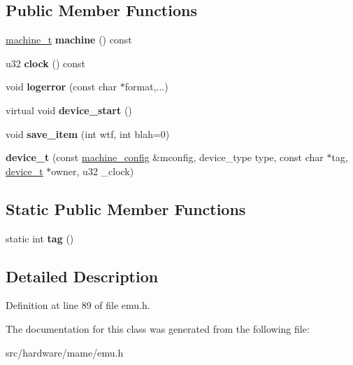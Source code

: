 \subsection*{Public Member Functions}
\begin{DoxyCompactItemize}
\item 
\hypertarget{classdevice__t_afe11f3dfed3f5952db60affa12ebece4}{\hyperlink{structdevice__t_1_1machine__t}{machine\-\_\-t} {\bfseries machine} () const }\label{classdevice__t_afe11f3dfed3f5952db60affa12ebece4}

\item 
\hypertarget{classdevice__t_a308991cb836a5d7733deb280d3c91d18}{u32 {\bfseries clock} () const }\label{classdevice__t_a308991cb836a5d7733deb280d3c91d18}

\item 
\hypertarget{classdevice__t_a13fbc9b8b779e8592e871c589ca1a6ad}{void {\bfseries logerror} (const char $\ast$format,...)}\label{classdevice__t_a13fbc9b8b779e8592e871c589ca1a6ad}

\item 
\hypertarget{classdevice__t_a230069bb9d64cc3dc2353e5069be1294}{virtual void {\bfseries device\-\_\-start} ()}\label{classdevice__t_a230069bb9d64cc3dc2353e5069be1294}

\item 
\hypertarget{classdevice__t_a6d4346c89ce538c096e6ae71308336ea}{void {\bfseries save\-\_\-item} (int wtf, int blah=0)}\label{classdevice__t_a6d4346c89ce538c096e6ae71308336ea}

\item 
\hypertarget{classdevice__t_a764a57dca49319a408af8c9f7f86017b}{{\bfseries device\-\_\-t} (const \hyperlink{structmachine__config}{machine\-\_\-config} \&mconfig, device\-\_\-type type, const char $\ast$tag, \hyperlink{classdevice__t}{device\-\_\-t} $\ast$owner, u32 \-\_\-clock)}\label{classdevice__t_a764a57dca49319a408af8c9f7f86017b}

\end{DoxyCompactItemize}
\subsection*{Static Public Member Functions}
\begin{DoxyCompactItemize}
\item 
\hypertarget{classdevice__t_a77b587f03710c5d01fc1d572ed7ebd02}{static int {\bfseries tag} ()}\label{classdevice__t_a77b587f03710c5d01fc1d572ed7ebd02}

\end{DoxyCompactItemize}


\subsection{Detailed Description}


Definition at line 89 of file emu.\-h.



The documentation for this class was generated from the following file\-:\begin{DoxyCompactItemize}
\item 
src/hardware/mame/emu.\-h\end{DoxyCompactItemize}
